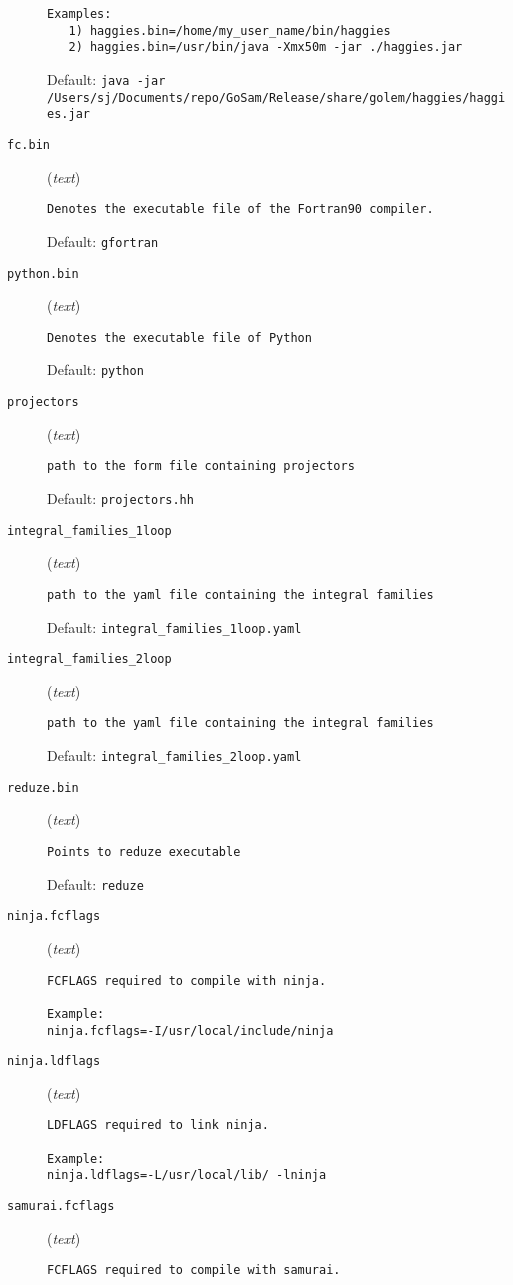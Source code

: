 \begin{description}
\begin{verbatim}
Examples:
   1) haggies.bin=/home/my_user_name/bin/haggies
   2) haggies.bin=/usr/bin/java -Xmx50m -jar ./haggies.jar
\end{verbatim}
Default: \verb|java -jar /Users/sj/Documents/repo/GoSam/Release/share/golem/haggies/haggies.jar|
\item[\texttt{fc.bin}] (\textit{text})
\begin{verbatim}
Denotes the executable file of the Fortran90 compiler.
\end{verbatim}
Default: \verb|gfortran|
\item[\texttt{python.bin}] (\textit{text})
\begin{verbatim}
Denotes the executable file of Python
\end{verbatim}
Default: \verb|python|
\item[\texttt{projectors}] (\textit{text})
\begin{verbatim}
path to the form file containing projectors
\end{verbatim}
Default: \verb|projectors.hh|
\item[\texttt{integral\_families\_1loop}] (\textit{text})
\begin{verbatim}
path to the yaml file containing the integral families
\end{verbatim}
Default: \verb|integral_families_1loop.yaml|
\item[\texttt{integral\_families\_2loop}] (\textit{text})
\begin{verbatim}
path to the yaml file containing the integral families
\end{verbatim}
Default: \verb|integral_families_2loop.yaml|
\item[\texttt{reduze.bin}] (\textit{text})
\begin{verbatim}
Points to reduze executable
\end{verbatim}
Default: \verb|reduze|
\item[\texttt{ninja.fcflags}] (\textit{text})
\begin{verbatim}
FCFLAGS required to compile with ninja.

Example:
ninja.fcflags=-I/usr/local/include/ninja
\end{verbatim}
\item[\texttt{ninja.ldflags}] (\textit{text})
\begin{verbatim}
LDFLAGS required to link ninja.

Example:
ninja.ldflags=-L/usr/local/lib/ -lninja
\end{verbatim}
\item[\texttt{samurai.fcflags}] (\textit{text})
\begin{verbatim}
FCFLAGS required to compile with samurai.


\end{verbatim}
\end{description}
